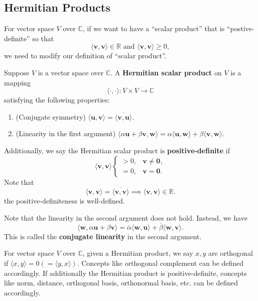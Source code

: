 \documentclass{ctexart}
\begin{document}
    \subsection{Hermitian Products}
		For vector space $V$ over $\mathbb{C}$, if we want to have a ``scalar product'' that is ``postive-definite'' so that
		\[
		\langle \mathbf{v}, \mathbf{v} \rangle \in \mathbb{R} \text{ and } \langle \mathbf{v}, \mathbf{v} \rangle \ge 0,
		\]
		we need to modify our definition of ``scalar product''.
	\begin{mydef}
		Suppose $V$ is a vector space over $\mathbb{C}$. A \textbf{Hermitian scalar product} on $V$ is a mapping
		\[
		\langle \cdot, \cdot \rangle : V \times V \to \mathbb{C}
		\]
		satisfying the following properties:
		\begin{enumerate}
			\item (Conjugate symmetry) $\langle \mathbf{u}, \mathbf{v} \rangle = \overline{\langle \mathbf{v}, \mathbf{u} \rangle}$.
			\item (Linearity in the first argument) $\langle \alpha \mathbf{u} + \beta \mathbf{v}, \mathbf{w} \rangle = \alpha \langle \mathbf{u}, \mathbf{w} \rangle + \beta \langle \mathbf{v}, \mathbf{w} \rangle$.
		\end{enumerate}
		Additionally, we say the Hermitian scalar product is \textbf{positive-definite} if
		\[
		\langle \mathbf{v}, \mathbf{v} \rangle 
		\begin{cases}
		> 0, & \mathbf{v} \neq \mathbf{0}, \\
		= 0, & \mathbf{v} = \mathbf{0}.
		\end{cases}
		\]
		Note that
		\[
		\langle \mathbf{v}, \mathbf{v} \rangle = \overline{\langle \mathbf{v}, \mathbf{v} \rangle} \implies \langle \mathbf{v}, \mathbf{v} \rangle \in \mathbb{R}.
		\]
		the positive-definiteness is well-defined.
	\end{mydef}
	\begin{myrmk}
		Note that the linearity in the second argument does not hold. Instead, we have
		\[
		\langle \mathbf{w}, \alpha \mathbf{u} + \beta \mathbf{v} \rangle = \overline{\alpha} \langle \mathbf{w}, \mathbf{u} \rangle + \overline{\beta} \langle \mathbf{w}, \mathbf{v} \rangle.
		\]
		This is called the \textbf{conjugate linearity} in the second argument.
	\end{myrmk}
	\begin{myrmk}
		For vector space $V$ over $\mathbb{C}$, given a Hermitian product, we say $x,y$ are orthogonal if $\langle x,y \rangle = 0\left( =\langle y,x \rangle \right)$. Concepts like orthogonal complement can be defined accordingly. If additionally the Hermitian product is positive-definite, concepts like norm, distance, orthogonal basis, orthonormal basis, etc. can be defined accordingly.
	\end{myrmk}
\end{document}
